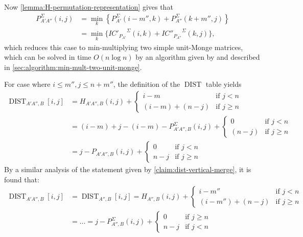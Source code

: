 \documentclass[twoside,11pt,openright]{report}
\newcommand{\DIST}{\operatorname{DIST}}
\newcommand*{\circled}[1]{\tikz[baseline=(char.base)]{
                          \node[shape=circle,draw,inner sep=2pt] (char) {#1};}}
\begin{document}
Now \cref{lemma:H-permutation-representation} gives that
\begin{align*}
  P_{A'A''}^{\Sigma}(i, j) &= \min_k \left\{ P_{A'}^{\Sigma}(i - m'', k) + P_{A''}^{\Sigma}(k + m'', j) \right\} \\
                           &= \min_k \{ {IC'_{P_{A'}}}^{\Sigma}(i, k) + {IC''_{P_{A''}}}^{\Sigma}(k, j) \},
\end{align*}
which reduces this case to min-multiplying two simple unit-Monge matrices, which can be solved in time $O(n \log{n})$ by an algorithm given by \cite{Tiskin:2010:FDM:1873601.1873704} and described in \cref{sec:algorithm:min-mult-two-unit-monge}.

For case \circled{1} where $i \leq m'', j \leq n + m''$, the definition of the $\DIST$ table yields
\begin{align*}
  \DIST_{A'A'',B}[i, j] &= H_{A'A'',B}(i, j) + \left\{
    \begin{array}{ll}
      i - m             & \text{if } j < n \\
      (i - m) + (n - j) & \text{if } j \geq n
    \end{array}
  \right. \\
  &= (i - m) + j - (i - m) - P_{A'A'',B}^\Sigma(i, j) + \left\{
    \begin{array}{ll}
      0             & \text{if } j < n \\
      (n - j)       & \text{if } j \geq n
    \end{array}
  \right. \\
  &= j - P_{A'A'',B}(i, j) + \left\{
    \begin{array}{ll}
      0             & \text{if } j < n \\
      n - j         & \text{if } j \geq n
    \end{array}
  \right.
\end{align*}
By a similar analysis of the statement given by \cref{claim:dist-vertical-merge}, it is found that:
\begin{align*}
  \DIST_{A'A'',B}[i, j] &= \DIST_{A'',B}[i, j] = H_{A'',B}(i, j) + \left\{
    \begin{array}{ll}
      i - m''             & \text{if } j < n \\
      (i - m'') + (n - j) & \text{if } j \geq n
    \end{array}
  \right. \\
  &= \dots = j - P_{A'',B}^{\Sigma}(i, j) + \left\{
    \begin{array}{ll}
      0             & \text{if } j \geq n \\
      n - j         & \text{if } j < n
    \end{array}
  \right.
\end{align*}
\end{document}
